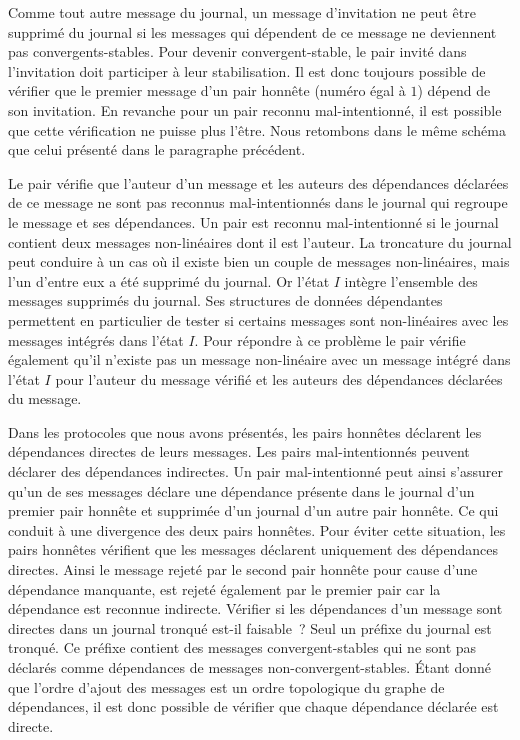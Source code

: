 Comme tout autre message du journal, un message d'invitation ne peut être supprimé du journal si les messages qui dépendent de ce message ne deviennent pas convergents-stables.
Pour devenir convergent-stable, le pair invité dans l'invitation doit participer à leur stabilisation.
Il est donc toujours possible de vérifier que le premier message d'un pair honnête (numéro égal à $1$) dépend de son invitation.
En revanche pour un pair reconnu mal-intentionné, il est possible que cette vérification ne puisse plus l'être.
Nous retombons dans le même schéma que celui présenté dans le paragraphe précédent.

Le pair vérifie que l'auteur d'un message et les auteurs des dépendances déclarées de ce message ne sont pas reconnus mal-intentionnés dans le journal qui regroupe le message et ses dépendances.
Un pair est reconnu mal-intentionné si le journal contient deux messages non-linéaires dont il est l'auteur.
La troncature du journal peut conduire à un cas où il existe bien un couple de messages non-linéaires, mais l'un d'entre eux a été supprimé du journal.
Or l'état $I$ intègre l'ensemble des messages supprimés du journal.
Ses structures de données dépendantes permettent en particulier de tester si certains messages sont non-linéaires avec les messages intégrés dans l'état $I$.
Pour répondre à ce problème le pair vérifie également qu'il n'existe pas un message non-linéaire avec un message intégré dans l'état $I$ pour l'auteur du message vérifié et les auteurs des dépendances déclarées du message.

Dans les protocoles que nous avons présentés, les pairs honnêtes déclarent les dépendances directes de leurs messages.
Les pairs mal-intentionnés peuvent déclarer des dépendances indirectes.
Un pair mal-intentionné peut ainsi s'assurer qu'un de ses messages déclare une dépendance présente dans le journal d'un premier pair honnête et supprimée d'un journal d'un autre pair honnête.
Ce qui conduit à une divergence des deux pairs honnêtes.
Pour éviter cette situation, les pairs honnêtes vérifient que les messages déclarent uniquement des dépendances directes.
Ainsi le message rejeté par le second pair honnête pour cause d'une dépendance manquante, est rejeté également par le premier pair car la dépendance est reconnue indirecte.
Vérifier si les dépendances d'un message sont directes dans un journal tronqué est-il faisable~?
Seul un préfixe du journal est tronqué.
Ce préfixe contient des messages convergent-stables qui ne sont pas déclarés comme dépendances de messages non-convergent-stables.
Étant donné que l'ordre d'ajout des messages est un ordre topologique du graphe de dépendances, il est donc possible de vérifier que chaque dépendance déclarée est directe.


